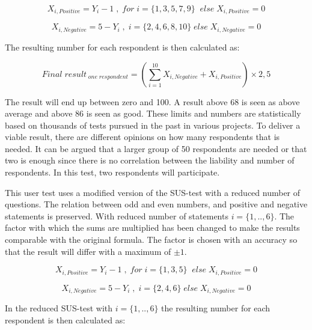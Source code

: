\documentclass{article}
\begin{document}
	\begin{equation}
		X_{i,Positive} = Y_i - 1 \;, \;for \;i = \{1,3,5,7,9\} \; \;else\;  X_{i,Positive} = 0
	\end{equation}
	
	\begin{equation}
		X_{i,Negative} = 5 - Y_i \;,\; i = \{2,4,6,8,10\}  \;else\;  X_{i,Negative} = 0
	\end{equation}
	
	\begin{center}
		The resulting number for each respondent is then calculated as: 
	\end{center}     
	
	\begin{equation}
		{Final\;result}_{\;one\;respondent} =  (\sum_{i=1}^{10} X_{i,Negative} + X_{i,Positive} ) \times 2,5 
	\end{equation}

	
	The result will end up between zero and 100. A result above 68 is seen as above average and above 86 is seen as good. These limits and numbers are statistically based on thousands of tests pursued in the past in various projects. To deliver a viable result, there are different opinions on how many respondents that is needed. It can be argued that a larger group of 50 respondents are needed or that two is enough since there is no correlation between the liability and number of respondents. In this test, two respondents will participate. 
	
	\smallskip
	This user test uses a modified version of the SUS-test with a reduced number of questions. The relation between odd and even numbers, and positive and negative statements is preserved.  With reduced number of statements $ i = \{1,..,6\}$. The factor with which the sums are  multiplied has been changed to make the results comparable with the original formula. The factor is chosen with an accuracy so that the result will differ with a maximum of $\pm 1 $.
	
	\begin{equation}
		X_{i,Positive} = Y_i - 1 \;, \;for \;i = \{1,3,5\} \; \;else\;  X_{i,Positive} = 0
	\end{equation}
	
	\begin{equation}
		X_{i,Negative} = 5 - Y_i \;,\; i = \{2,4,6\}  \;else\;  X_{i,Negative} = 0
	\end{equation}

	\begin{center}
		In the reduced SUS-test with $ i = \{1,..,6\}$ the resulting number for each respondent is then calculated as: 
	\end{center}
	
\end{document}
